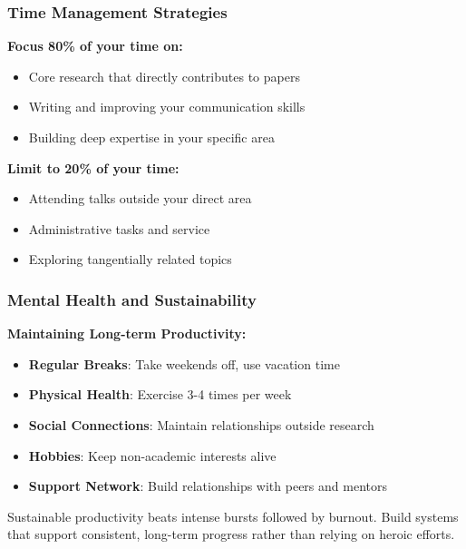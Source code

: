 \documentclass[11pt,a4paper]{article}
\begin{document}
\subsubsection{Time Management Strategies}

\begin{tcolorbox}[colback=green!10,colframe=green!50,title=The 80/20 Rule for PhD Productivity]
\textbf{Focus 80\% of your time on:}
\begin{itemize}
    \item Core research that directly contributes to papers
    \item Writing and improving your communication skills
    \item Building deep expertise in your specific area
\end{itemize}

\textbf{Limit to 20\% of your time:}
\begin{itemize}
    \item Attending talks outside your direct area
    \item Administrative tasks and service
    \item Exploring tangentially related topics
\end{itemize}
\end{tcolorbox}

\subsubsection{Mental Health and Sustainability}

\textbf{Maintaining Long-term Productivity:}
\begin{itemize}
    \item \textbf{Regular Breaks}: Take weekends off, use vacation time
    \item \textbf{Physical Health}: Exercise 3-4 times per week
    \item \textbf{Social Connections}: Maintain relationships outside research
    \item \textbf{Hobbies}: Keep non-academic interests alive
    \item \textbf{Support Network}: Build relationships with peers and mentors
\end{itemize}

\begin{tcolorbox}[colback=yellow!10,colframe=red!50,title={Remember: PhD is a Marathon, Not a Sprint}]
Sustainable productivity beats intense bursts followed by burnout. Build systems that support consistent, long-term progress rather than relying on heroic efforts.
\end{tcolorbox}
\end{document}

